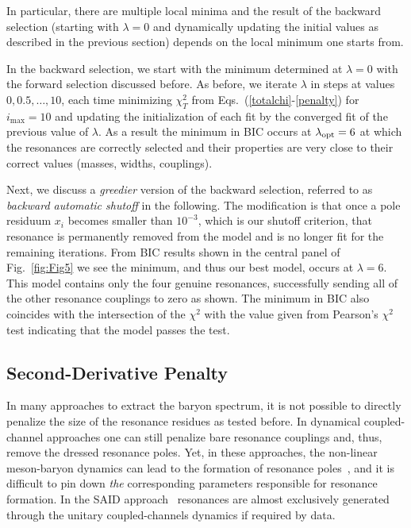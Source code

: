\documentclass[10pt,aps,prc,superscriptaddress,twoside,twocolumn,nofootinbib,showpacs,preprintnumbers]{revtex4-1}
\begin{document}
In particular, there are multiple local minima and the result of the backward selection (starting with $\lambda=0$ and dynamically updating the initial values as described in the previous section) depends on the local minimum one starts from. 

In the backward selection, we start with the minimum determined at $\lambda=0$ with the forward selection discussed before. As before, we iterate $\lambda$ in steps at values $0,0.5,\ldots,10$, each time minimizing $\chi^2_T$ from Eqs.~(\ref{totalchi}-\ref{penalty}) for $i_{\text{max}}=10$ and updating the initialization of each fit by the converged fit of the previous value of $\lambda$. As a result the minimum in BIC occurs at $\lambda_{\rm opt}=6$ at which the resonances are correctly selected and their properties are very close to their correct values (masses, widths, couplings).

Next, we discuss a {\it greedier} version of the backward selection, referred to as {\it backward automatic shutoff} in the following. The modification is that once a pole residuum $x_i$ becomes smaller than $10^{-3}$, which is our shutoff criterion, that resonance is permanently removed from the model and is no longer fit for the remaining iterations. From BIC results shown in the central panel of Fig.~\ref{fig:Fig5} we see the minimum, and thus our best model, occurs at $\lambda=6$. This model contains only the four genuine resonances, successfully sending all of the other resonance couplings to zero as shown. The minimum in BIC also coincides  with the intersection of the $\chi^2$ with the value given from Pearson's $\chi^2$ test indicating that the model passes the test. 


\subsection{Second-Derivative Penalty}
\label{SecDeriv}

In many approaches to extract the baryon spectrum, it is not possible to directly penalize the size of the resonance residues as tested before. In dynamical coupled-channel approaches one can still penalize bare resonance couplings and, thus, remove the dressed resonance poles. Yet, in these approaches, the non-linear meson-baryon dynamics can lead to the formation of resonance poles~\cite{Doring:2009bi}, and it is difficult to pin down \textit{the} corresponding parameters responsible for resonance formation. In the SAID approach~\cite{Workman:2012jf} resonances are almost exclusively generated through the unitary coupled-channels dynamics if required by data. 
\end{document}
